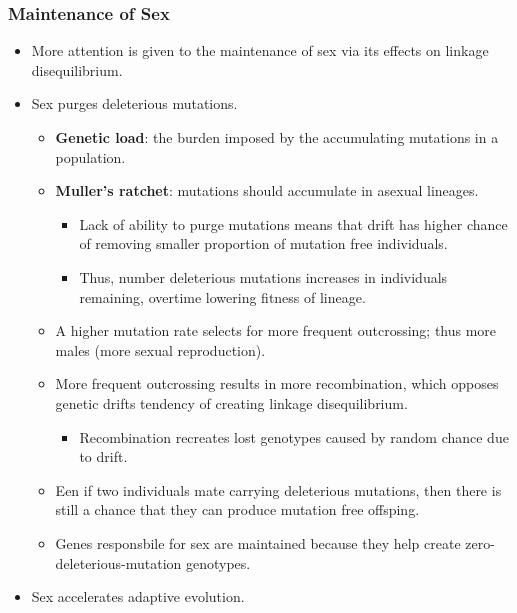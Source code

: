 \documentclass[12pt,a4paper]{article}
\begin{document}
\begin{itemize}
    \subsubsection{Maintenance of Sex}
    \begin{itemize}
        \item More attention is given to the maintenance of sex via its effects on linkage disequilibrium. 
        \item Sex {\color{o-Sun}purges deleterious mutations}.
            \begin{itemize}
                \item \textbf{Genetic load}: the burden imposed by the accumulating mutations in a population.
                \item \textbf{Muller's ratchet}: mutations should accumulate in asexual lineages.
                    \begin{itemize}
                        \item Lack of ability to purge mutations means that drift has higher chance of removing smaller proportion of mutation free individuals.
                        \item Thus, number deleterious mutations increases in individuals remaining, overtime lowering fitness of lineage. 
                    \end{itemize}
                \item A higher mutation rate selects for more frequent outcrossing; thus more males (more sexual reproduction).
                \item More frequent outcrossing results in more recombination, which opposes genetic drifts tendency of creating linkage disequilibrium.
                    \begin{itemize}
                        \item Recombination recreates lost genotypes caused by random chance due to drift.
                    \end{itemize}
                \item Een if two individuals mate carrying deleterious mutations, then there is still a chance that they can produce mutation free offsping.
                \item Genes responsbile for sex are maintained because they help create zero-deleterious-mutation genotypes. 
            \end{itemize}
        \item Sex {\color{o-Sun}accelerates adaptive evolution}.
            \begin{itemize}

\end{itemize}
\end{itemize}
\end{itemize}
\end{document}
